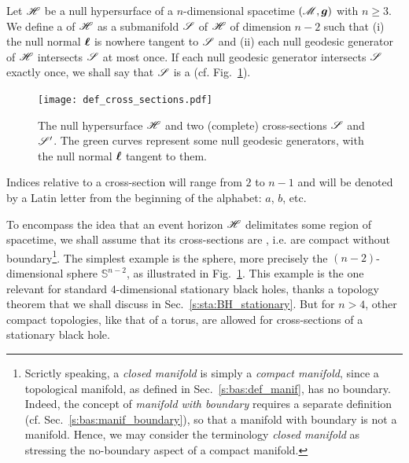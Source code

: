 \begin{greybox}
Let $\mathscr{H}$ be a null hypersurface of a $n$-dimensional spacetime $(\mathscr{M}, \bm{g})$
with $n\geq 3$.
We define a  of $\mathscr{H}$
as a submanifold $\mathscr{S}$ of $\mathscr{H}$ of dimension $n-2$
such that (i) the null normal $\bm{\ell}$ is nowhere tangent to $\mathscr{S}$ and (ii)
each null geodesic generator of $\mathscr{H}$ intersects $\mathscr{S}$ at most once.
If each null geodesic generator intersects $\mathscr{S}$ exactly once,
we shall say that $\mathscr{S}$ is a
(cf. Fig.~\ref{f:def:hor_cylinder}).
\end{greybox}

\begin{figure}
\centerline{\texttt{[image: def\_cross\_sections.pdf]}}
\caption[]{\label{f:def:hor_cylinder} \footnotesize
The null hypersurface $\mathscr{H}$ and two (complete) cross-sections $\mathscr{S}$ and $\mathscr{S}'$.
The green curves represent some null geodesic generators, with the null normal
$\bm{\ell}$ tangent to them.}
\end{figure}

\begin{notation}
Indices relative to a cross-section will range from $2$ to $n-1$ and
will be denoted by a Latin letter from the beginning of the alphabet: $a$, $b$, etc.
\end{notation}

To encompass the idea that an event horizon $\mathscr{H}$ delimitates some
region of spacetime, we shall assume that its cross-sections
are , i.e.
are compact without boundary\footnote{Scrictly speaking, a
\emph{closed manifold} is simply a \emph{compact manifold},
since a topological manifold, as defined in Sec.~\ref{s:bas:def_manif},
has no boundary. Indeed, the concept of \emph{manifold with boundary} requires
a separate definition (cf. Sec.~\ref{s:bas:manif_boundary}),
so that a manifold with boundary is not a manifold.
Hence, we may consider the terminology \emph{closed manifold}
as stressing the no-boundary aspect of a compact manifold.}.
The simplest example is the sphere,
more precisely the $(n-2)$-dimensional sphere $\mathbb{S}^{n-2}$,
as illustrated in Fig.~\ref{f:def:hor_cylinder}.
This example is the one relevant for standard 4-dimensional
stationary black holes, thanks a topology theorem that
we shall discuss in Sec.~\ref{s:sta:BH_stationary}.
But for $n > 4$, other
compact topologies, like that of a torus, are allowed for
cross-sections of a stationary black hole.

